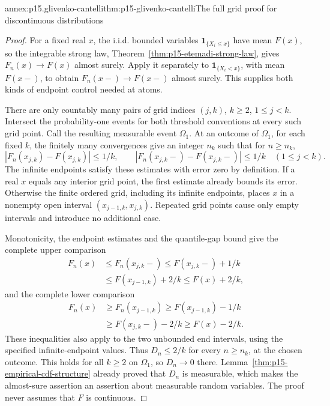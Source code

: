 \begin{annexitem}{annex:p15.glivenko-cantelli}{thm:p15-glivenko-cantelli}{The full grid proof for discontinuous distributions}
\begin{proof}
For a fixed real \(x\), the i.i.d. bounded variables
\(\mathbf1_{\{X_i\leq x\}}\) have mean \(F(x)\), so the
integrable strong law, Theorem~\ref{thm:p15-etemadi-strong-law},
gives \(F_n(x)\to F(x)\) almost surely.
Apply it separately to \(\mathbf1_{\{X_i<x\}}\), with mean
\(F(x-)\), to obtain \(F_n(x-)\to F(x-)\) almost surely.
This supplies both kinds of endpoint control needed at atoms.

There are only countably many pairs of grid indices
\((j,k)\), \(k\geq2\), \(1\leq j<k\). Intersect the
probability-one events for both threshold conventions at every such
grid point. Call the resulting measurable event \(\Omega_1\).
At an outcome of \(\Omega_1\), for each fixed \(k\), the finitely
many convergences give an integer \(n_k\) such that for \(n\geq n_k\),
\[
 |F_n(x_{j,k})-F(x_{j,k})|\leq1/k,\qquad
 |F_n(x_{j,k}-)-F(x_{j,k}-)|\leq1/k
                         \quad(1\leq j<k).
\]
The infinite endpoints satisfy these estimates with error zero by
definition. If a real \(x\) equals any interior grid point, the
first estimate already bounds its error. Otherwise the finite
ordered grid, including its infinite endpoints, places \(x\) in
a nonempty open interval \((x_{j-1,k},x_{j,k})\).
Repeated grid points cause only empty intervals and introduce no
additional case.

Monotonicity, the endpoint estimates and the quantile-gap bound give
the complete upper comparison
\[
 \begin{aligned}
 F_n(x)&\leq F_n(x_{j,k}-)
       \leq F(x_{j,k}-)+1/k\\
       &\leq F(x_{j-1,k})+2/k
       \leq F(x)+2/k,
 \end{aligned}
\]
and the complete lower comparison
\[
 \begin{aligned}
 F_n(x)&\geq F_n(x_{j-1,k})
       \geq F(x_{j-1,k})-1/k\\
       &\geq F(x_{j,k}-)-2/k
       \geq F(x)-2/k.
 \end{aligned}
\]
These inequalities also apply to the two unbounded end intervals,
using the specified infinite-endpoint values. Thus \(D_n\leq2/k\)
for every \(n\geq n_k\), at the chosen outcome. This holds for
all \(k\geq2\) on \(\Omega_1\), so \(D_n\to0\) there.
Lemma~\ref{thm:p15-empirical-cdf-structure} already proved that \(D_n\) is measurable,
which makes the almost-sure assertion an assertion about measurable
random variables. The proof never assumes that \(F\) is continuous.
\end{proof}
\end{annexitem}


